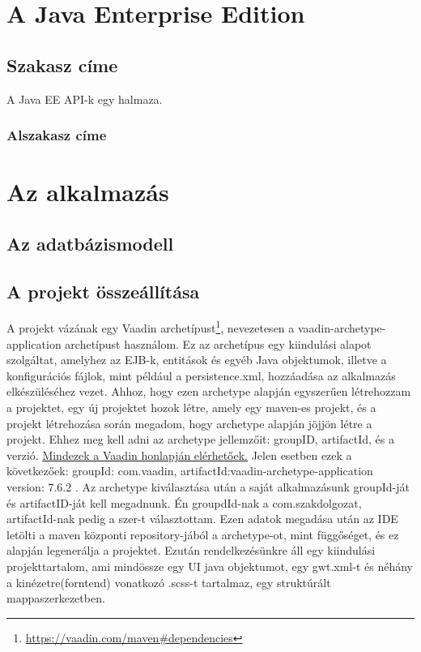 \documentclass[centeredchapter]{thesis-ekf}
\theoremstyle{definition}
\theoremstyle{remark}
\begin{document}
\chapter{A Java Enterprise Edition}

\section{Szakasz címe}

A Java EE API-k egy halmaza.

\subsection{Alszakasz címe}

\chapter{Az alkalmazás}

\section{Az adatbázismodell}

\section{A projekt összeállítása}

A projekt vázának egy Vaadin archetípust\footnote{\url{https://vaadin.com/maven\#dependencies}}, nevezetesen a vaadin-archetype-application archetípust használom. Ez az archetípus egy kiindulási alapot szolgáltat, amelyhez az EJB-k, entitások és egyéb Java objektumok, illetve a konfigurációs fájlok, mint például a persistence.xml, hozzáadása az alkalmazás elkészüléséhez vezet.
Ahhoz, hogy ezen archetype alapján egyszerűen létrehozzam a projektet, egy új projektet hozok létre, amely egy maven-es projekt, és a projekt létrehozása során megadom, hogy archetype alapján jöjjön létre a projekt. Ehhez meg kell adni az archetype jellemzőit: groupID, artifactId, és a verzió. \href{https://vaadin.com/maven#dependencies}{Mindezek a Vaadin honlapján elérhetőek.} Jelen esetben ezek a következőek: groupId: com.vaadin, artifactId:vaadin-archetype-application version: 7.6.2 . Az archetype kiválasztása után a saját alkalmazásunk groupId-ját és artifactID-ját kell megadnunk. Én groupdId-nak a com.szakdolgozat, artifactId-nak pedig a szer-t választottam. Ezen adatok megadása után az IDE letölti a maven központi repository-jából a archetype-ot, mint függőséget, és ez alapján legenerálja a projektet. Ezután rendelkezésünkre áll egy kiindulási projekttartalom, ami mindössze egy UI java objektumot, egy gwt.xml-t és néhány a kinézetre(forntend) vonatkozó .scss-t tartalmaz, egy struktúrált mappaszerkezetben.
\end{document}
